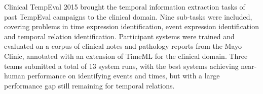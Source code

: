 Clinical TempEval 2015 brought the temporal information extraction tasks of past TempEval campaigns to the clinical domain. Nine sub-tasks were included, covering problems in time expression identification, event expression identification and temporal relation identification. Participant systems were trained and evaluated on a corpus of clinical notes and pathology reports from the Mayo Clinic, annotated with an extension of TimeML for the clinical domain. Three teams submitted a total of 13 system runs, with the best systems achieving near-human performance on identifying events and times, but with a large performance gap still remaining for temporal relations.

